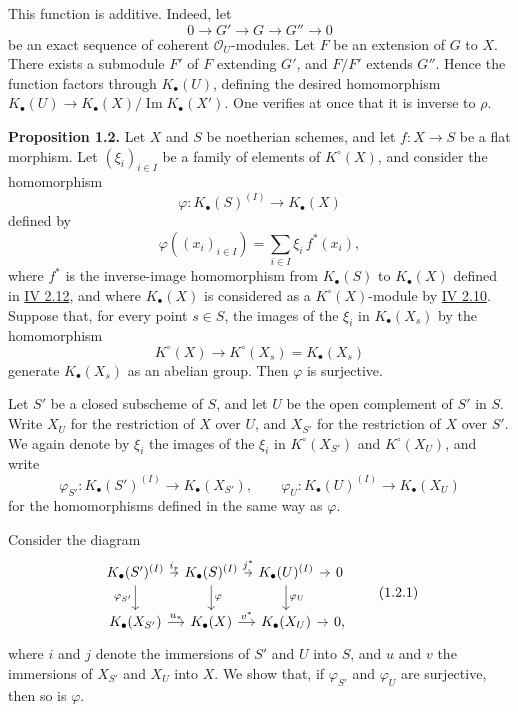 This function is additive. Indeed, let
\[
0\longrightarrow G'\longrightarrow G\longrightarrow G''\longrightarrow 0
\]
be an exact sequence of coherent $\mathcal O_U$-modules. Let $F$ be an extension of $G$ to $X$. There exists a submodule $F'$ of $F$ extending $G'$, and $F/F'$ extends $G''$. Hence the function factors through $K_\bullet(U)$, defining the desired homomorphism $K_\bullet(U)\to K_\bullet(X)/\operatorname{Im}K_\bullet(X')$. One verifies at once that it is inverse to $\rho$.

\textbf{Proposition 1.2.} Let $X$ and $S$ be noetherian schemes, and let $f:X\to S$ be a flat morphism. Let $(\xi_i)_{i\in I}$ be a family of elements of $K^\circ(X)$, and consider the homomorphism
\[
 \varphi:K_\bullet(S)^{(I)}\longrightarrow K_\bullet(X)
\]
defined by
\[
 \varphi((x_i)_{i\in I})=\sum_{i\in I}\xi_i\,f^*(x_i),
\]
where $f^*$ is the inverse-image homomorphism from $K_\bullet(S)$ to $K_\bullet(X)$ defined in \hyperlink{sga6.e04.para.2-12}{IV 2.12}, and where $K_\bullet(X)$ is considered as a $K^\circ(X)$-module by \hyperlink{sga6.e04.para.2-10}{IV 2.10}. Suppose that, for every point $s\in S$, the images of the $\xi_i$ in $K_\bullet(X_s)$ by the homomorphism
\[
 K^\circ(X)\longrightarrow K^\circ(X_s)=K_\bullet(X_s)
\]
generate $K_\bullet(X_s)$ as an abelian group. Then $\varphi$ is surjective.

Let $S'$ be a closed subscheme of $S$, and let $U$ be the open complement of $S'$ in $S$. Write $X_U$ for the restriction of $X$ over $U$, and $X_{S'}$ for the restriction of $X$ over $S'$. We again denote by $\xi_i$ the images of the $\xi_i$ in $K^\circ(X_{S'})$ and $K^\circ(X_U)$, and write
\[
 \varphi_{S'}:K_\bullet(S')^{(I)}\to K_\bullet(X_{S'}),\qquad
 \varphi_U:K_\bullet(U)^{(I)}\to K_\bullet(X_U)
\]
for the homomorphisms defined in the same way as $\varphi$.

Consider the diagram
\[
\begin{tikzcd}[column sep=tiny]
K_\bullet(S')^{(I)} \arrow[r,"i_*"] \arrow[d,"\varphi_{S'}"'] &
K_\bullet(S)^{(I)} \arrow[r,"j^*"] \arrow[d,"\varphi"] &
K_\bullet(U)^{(I)} \arrow[r] \arrow[d,"\varphi_U"] & 0\\
K_\bullet(X_{S'}) \arrow[r,"u_*"] & K_\bullet(X) \arrow[r,"v^*"] & K_\bullet(X_U) \arrow[r] & 0,
\end{tikzcd}\tag{1.2.1}
\]
where $i$ and $j$ denote the immersions of $S'$ and $U$ into $S$, and $u$ and $v$ the immersions of $X_{S'}$ and $X_U$ into $X$. We show that, if $\varphi_{S'}$ and $\varphi_U$ are surjective, then so is $\varphi$.

